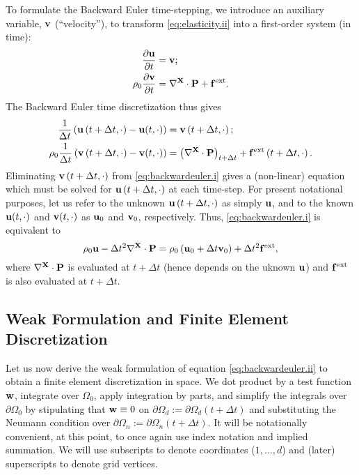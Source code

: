 To formulate the Backward Euler time-stepping, we introduce an auxiliary variable, $\mathbf{v}$ (``velocity''), to transform \eqref{eq:elasticity.ii} into a first-order system (in time):
\begin{align*}
\frac{\partial \mathbf{u}}{\partial t} & = \mathbf{v}; \\
\rho_0 \frac{\partial \mathbf{v}}{\partial t} & = \nabla^{\mathbf{X}} \cdot \mathbf{P} + \mathbf{f}^{\text{ext}}.
\end{align*}
The Backward Euler time discretization thus gives
\begin{subequations}\label{eq:backwardeuler.i}
\begin{align}
\frac{1}{\Delta t} \left( \mathbf{u} \left( t + \Delta t, \cdot \right) - \mathbf{u}(t,\cdot) \right) & = \mathbf{v} \left( t + \Delta t, \cdot \right); \\
\rho_0 \frac{1}{\Delta t} \left( \mathbf{v} \left( t + \Delta t, \cdot \right) - \mathbf{v}(t,\cdot) \right) & = \left( \nabla^{\mathbf{X}} \cdot \mathbf{P} \right)_{t + \Delta t} + \mathbf{f}^{\text{ext}} \left( t + \Delta t, \cdot \right).
\end{align}
\end{subequations}
Eliminating $\mathbf{v} \left( t + \Delta t, \cdot \right)$ from \eqref{eq:backwardeuler.i} gives a (non-linear) equation which must be solved for $\mathbf{u} \left( t + \Delta t, \cdot \right)$ at each time-step. For present notational purposes, let us refer to the unknown $\mathbf{u} \left( t + \Delta t, \cdot \right)$ as simply $\mathbf{u}$, and to the known $\mathbf{u}(t,\cdot)$ and $\mathbf{v}(t,\cdot)$ as $\mathbf{u}_0$ and $\mathbf{v}_0$, respectively. Thus, \eqref{eq:backwardeuler.i} is equivalent to
\begin{equation}\label{eq:backwardeuler.ii}
\rho_0 \mathbf{u} - \Delta t^2 \nabla^{\mathbf{X}} \cdot \mathbf{P} = \rho_0 \left( \mathbf{u}_0 + \Delta t \mathbf{v}_0 \right) + \Delta t^2 \mathbf{f}^{\text{ext}},
\end{equation}
where $\nabla^{\mathbf{X}} \cdot \mathbf{P}$ is evaluated at $t + \Delta t$ (hence depends on the uknown $\mathbf{u}$) and $\mathbf{f}^{\text{ext}}$ is also evaluated at $t + \Delta t$.

\subsection{Weak Formulation and Finite Element Discretization}

Let us now derive the weak formulation of equation \eqref{eq:backwardeuler.ii} to obtain a finite element discretization in space. We dot product by a test function $\mathbf{w}$, integrate over $\Omega_0$, apply integration by parts, and simplify the integrals over $\partial \Omega_0$ by stipulating that $\mathbf{w} \equiv 0$ on $\partial \Omega_d := \partial \Omega_d(t + \Delta t)$ and substituting the Neumann condition over $\partial \Omega_n := \partial \Omega_n(t + \Delta t)$. It will be notationally convenient, at this point, to once again use index notation and implied summation. We will use subscripts to denote coordinates ($1, \dotsc, d$) and (later) superscripts to denote grid vertices.

